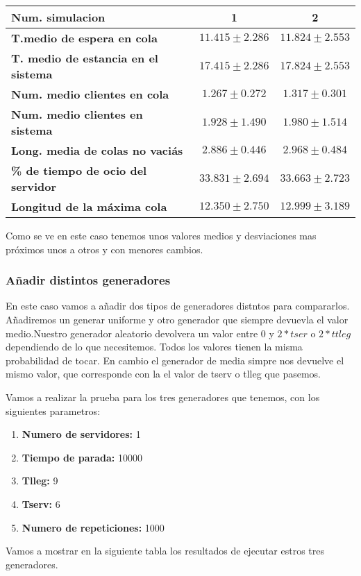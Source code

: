 \documentclass[]{article}
\begin{document}
\begin{table}[H]
	\begin{center}
		\begin{tabularx}{1\textwidth}{|X|c|c|}
			\hline
			\textbf{Num. simulacion} &  1 & 2\\
			\hline \hline
			\textbf{T.medio de espera en cola}& $11.415\pm2.286$ & $11.824\pm2.553$ \\ \hline
			\textbf{T. medio de estancia en el sistema} & $17.415\pm2.286$ & $17.824\pm2.553$ \\ \hline
			\textbf{Num. medio clientes en cola} & $1.267\pm0.272$& $1.317\pm0.301$ \\  \hline
			\textbf{Num. medio clientes en sistema} & $1.928\pm1.490$& $1.980\pm1.514$ \\ \hline
			\textbf{Long. media de colas no vaciás} & $2.886\pm0.446$& $2.968\pm0.484$ \\ \hline
			\textbf{\% de tiempo de ocio del servidor} & $33.831\pm2.694$ & $33.663\pm2.723$ \\ \hline
			\textbf{Longitud de la máxima cola} &$12.350\pm2.750$& $12.999\pm3.189$ \\ \hline
		\end{tabularx}
		
	\end{center}
\end{table}
Como se ve en este caso tenemos unos valores medios y desviaciones mas próximos unos a otros y con menores cambios.
\subsubsection{Añadir distintos generadores}
En este caso vamos a añadir dos tipos de generadores distntos para compararlos. Añadiremos un generar uniforme y otro generador que siempre devuevla el valor medio.Nuestro generador aleatorio devolvera un valor entre 0 y $2*tser$ o $2*ttleg$ dependiendo de lo que necesitemos. Todos los valores tienen la misma probabilidad de tocar. En cambio el generador de media simpre nos devuelve el mismo valor, que corresponde con la el valor de tserv o tlleg que pasemos. 

Vamos a realizar la prueba para los tres generadores que tenemos, con los siguientes parametros:
\begin{enumerate}
	\item \textbf{Numero de servidores:} 1
	\item \textbf{Tiempo de parada:} 10000
	\item \textbf{Tlleg:} 9
	\item \textbf{Tserv:} 6
	\item \textbf{Numero de repeticiones:} 1000
\end{enumerate} 
Vamos a mostrar en la siguiente tabla los resultados de ejecutar estros tres generadores.
\end{document}

